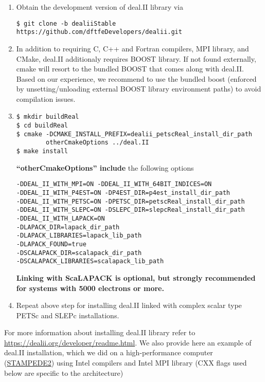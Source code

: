 \begin{enumerate}

\item Obtain the development version of deal.II library via
\begin{verbatim}
$ git clone -b dealiiStable https://github.com/dftfeDevelopers/dealii.git
\end{verbatim}

\item In addition to requiring C, C++ and Fortran compilers, MPI library, and CMake, deal.II additionaly requires BOOST library. If not found externally, cmake will resort to the bundled BOOST that comes along with deal.II. Based on our experience, we recommend to use the bundled boost (enforced by unsetting/unloading external BOOST library environment paths) to avoid compilation issues.

\item
\begin{verbatim}
$ mkdir buildReal
$ cd buildReal
$ cmake -DCMAKE_INSTALL_PREFIX=dealii_petscReal_install_dir_path
        otherCmakeOptions ../deal.II
$ make install
\end{verbatim}
{\bf ``otherCmakeOptions'' include} the following options
\begin{verbatim}
-DDEAL_II_WITH_MPI=ON -DDEAL_II_WITH_64BIT_INDICES=ON
-DDEAL_II_WITH_P4EST=ON -DP4EST_DIR=p4est_install_dir_path
-DDEAL_II_WITH_PETSC=ON -DPETSC_DIR=petscReal_install_dir_path 
-DDEAL_II_WITH_SLEPC=ON -DSLEPC_DIR=slepcReal_install_dir_path
-DDEAL_II_WITH_LAPACK=ON
-DLAPACK_DIR=lapack_dir_path 
-DLAPACK_LIBRARIES=lapack_lib_path
-DLAPACK_FOUND=true
-DSCALAPACK_DIR=scalapack_dir_path
-DSCALAPACK_LIBRARIES=scalapack_lib_path
\end{verbatim}
{\bf Linking with ScaLAPACK is optional, but strongly recommended for systems with 5000 electrons or more.}

\item Repeat above step for installing deal.II linked with complex scalar type PETSc and SLEPc installations. 
\end{enumerate}	
 For more information about installing deal.II library refer to \url{https://dealii.org/developer/readme.html}. We also provide here an example of deal.II installation, which we did on a high-performance computer (\href{https://www.tacc.utexas.edu/systems/stampede2}{STAMPEDE2}) using Intel compilers and Intel MPI library (CXX flags used below are specific to the architecture)
